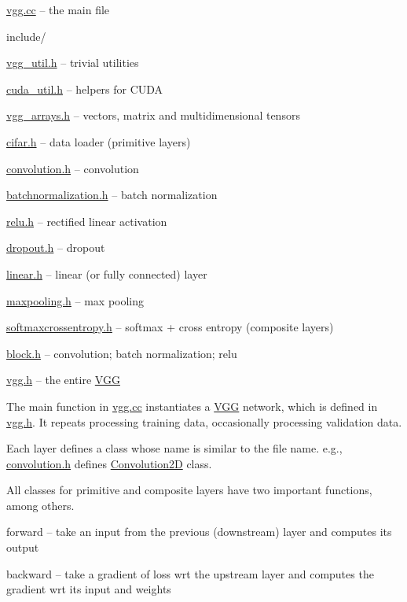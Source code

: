 \begin{DoxyItemize}
\item \hyperlink{vgg_8cc}{vgg.\+cc} -- the main file
\item include/
\begin{DoxyItemize}
\item \hyperlink{vgg__util_8h}{vgg\+\_\+util.\+h} -- trivial utilities
\item \hyperlink{cuda__util_8h}{cuda\+\_\+util.\+h} -- helpers for C\+U\+DA
\item \hyperlink{vgg__arrays_8h}{vgg\+\_\+arrays.\+h} -- vectors, matrix and multidimensional tensors
\item \hyperlink{cifar_8h}{cifar.\+h} -- data loader (primitive layers)
\item \hyperlink{convolution_8h}{convolution.\+h} -- convolution
\item \hyperlink{batchnormalization_8h}{batchnormalization.\+h} -- batch normalization
\item \hyperlink{relu_8h}{relu.\+h} -- rectified linear activation
\item \hyperlink{dropout_8h}{dropout.\+h} -- dropout
\item \hyperlink{linear_8h}{linear.\+h} -- linear (or fully connected) layer
\item \hyperlink{maxpooling_8h}{maxpooling.\+h} -- max pooling
\item \hyperlink{softmaxcrossentropy_8h}{softmaxcrossentropy.\+h} -- softmax + cross entropy (composite layers)
\item \hyperlink{block_8h}{block.\+h} -- convolution; batch normalization; relu
\item \hyperlink{vgg_8h}{vgg.\+h} -- the entire \hyperlink{structVGG}{V\+GG}
\end{DoxyItemize}
\end{DoxyItemize}

The main function in \hyperlink{vgg_8cc}{vgg.\+cc} instantiates a \hyperlink{structVGG}{V\+GG} network, which is defined in \hyperlink{vgg_8h}{vgg.\+h}. It repeats processing training data, occasionally processing validation data.

Each layer defines a class whose name is similar to the file name. e.\+g., \hyperlink{convolution_8h}{convolution.\+h} defines \hyperlink{structConvolution2D}{Convolution2D} class.

All classes for primitive and composite layers have two important functions, among others.
\begin{DoxyItemize}
\item forward -- take an input from the previous (downstream) layer and computes its output
\item backward -- take a gradient of loss wrt the upstream layer and computes the gradient wrt its input and weights
\end{DoxyItemize}

